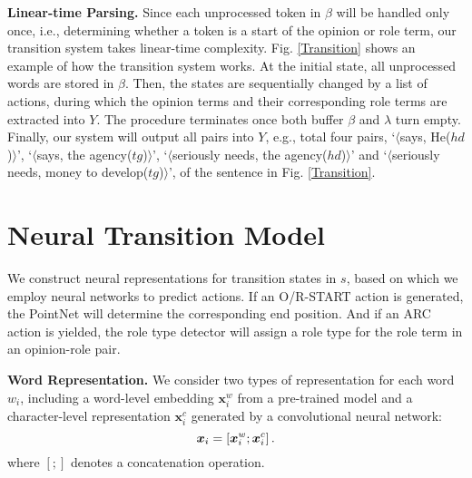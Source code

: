 \documentclass[letterpaper]{article} \usepackage{aaai22}  \usepackage{times}  \usepackage{helvet}  \usepackage{courier}  \usepackage[hyphens]{url}  \usepackage{graphicx} \urlstyle{rm} \def\UrlFont{\rm}  \usepackage{natbib}  \usepackage{caption} \DeclareCaptionStyle{ruled}{labelfont=normalfont,labelsep=colon,strut=off} \frenchspacing  \setlength{\pdfpagewidth}{8.5in}  \setlength{\pdfpageheight}{11in}  \usepackage{algorithm}
\begin{document}
\noindent\textbf{Linear-time Parsing.}
Since each unprocessed token in $\beta$ will be handled only once, i.e., determining whether a token is a start of the opinion or role term, our transition system takes linear-time complexity.
Fig. \ref{Transition} shows an example of how the transition system works.
At the initial state, all unprocessed words are stored in $\beta$.
Then, the states are sequentially changed by a list of actions, during which the opinion terms and their corresponding role terms are extracted into $Y$.
The procedure terminates once both buffer $\beta$ and $\lambda$ turn empty.
Finally, our system will output all pairs into $Y$, e.g., total four pairs, `$\langle$says, He($hd$)$\rangle$', `$\langle$says, the agency($tg$)$\rangle$', `$\langle$seriously needs, the agency($hd$)$\rangle$' and `$\langle$seriously needs, money to develop($tg$)$\rangle$', of the sentence in Fig. \ref{Transition}.













\section{Neural Transition Model}

We construct neural representations for transition states in $s$, based on which we employ neural networks to predict actions.
If an O/R-START action is generated, the PointNet will determine the corresponding end position.
And if an ARC action is yielded, the role type detector will assign a role type for the role term in an opinion-role pair.



\noindent\textbf{Word Representation.}
We consider two types of representation for each word $w_i$, including a word-level embedding $\bm{x}^{w}_i$ from a pre-trained model and a character-level representation $\bm{x}^{c}_i$ generated by a convolutional neural network:
\begin{equation}
\setlength\abovedisplayskip{2pt}
\setlength\belowdisplayskip{2pt}
\bm{x}_i = [\bm{x}^{w}_i;\bm{x}^{c}_i] \,.
\end{equation}
where $[;]$ denotes a concatenation operation.
\end{document}
